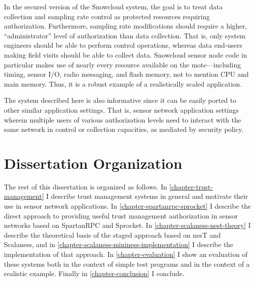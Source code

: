 \snowcloudfig

In the secured version of the Snowcloud system, the goal is to treat data collection and
sampling rate control as protected resources requiring authorization. Furthermore, sampling rate
modifications should require a higher, ``administrator'' level of authorization than data
collection. That is, only system engineers should be able to perform control operations, whereas
data end-users making field visits should be able to collect data. Snowcloud sensor node code in
particular makes use of nearly every resource available on the mote---including timing, sensor
I/O, radio messaging, and flash memory, not to mention CPU and main memory. Thus, it is a robust
example of a realistically scaled application.

The system described here is also informative since it can be easily ported to other similar
application settings. That is, sensor network application settings wherein multiple users of
various authorization levels need to interact with the same network in control or collection
capacities, as mediated by security policy.

\section{Dissertation Organization}

The rest of this dissertation is organized as follows. In \autoref{chapter-trust-management} I
describe trust management systems in general and motivate their use in sensor network
applications. In \autoref{chapter-spartanrpc-sprocket} I describe the direct approach to
providing useful trust management authorization in sensor networks based on SpartanRPC and
Sprocket. In \autoref{chapter-scalaness-nest-theory} I describe the theoretical basis of the
staged approach based on nesT and Scalaness, and in
\autoref{chapter-scalaness-mininess-implementation} I describe the implementation of that
approach. In \autoref{chapter-evaluation} I show an evaluation of these systems both in the
context of simple test programs and in the context of a realistic example. Finally in
\autoref{chapter-conclusion} I conclude.

